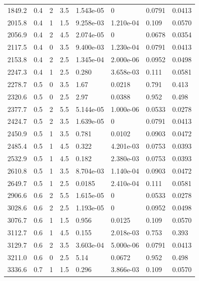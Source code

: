 \documentclass[preview]{standalone}
\begin{document}
{{{\begin{tabular}{L{1.2cm}C{1.2cm} C{0.3cm}C{0.5cm} C{1.4cm}C{1.4cm} C{1.4cm}C{1.4cm}}
  1849.2  &   0.4  & 2     & 3.5 &  1.543e-05  & 0  & 0.0791 &  0.0413   \\ 
  2015.8  &   0.4  & 1     & 1.5 &  9.258e-03  & 1.210e-04  & 0.109 &  0.0570   \\ 
  2056.9  &   0.4  & 2     & 4.5 &  2.074e-05  & 0  & 0.0678 &  0.0354   \\ 
  2117.5  &   0.4  & 0     & 3.5 &  9.400e-03  & 1.230e-04  & 0.0791 &  0.0413   \\ 
  2153.8  &   0.4  & 2     & 2.5 &  1.345e-04  & 2.000e-06  & 0.0952 &  0.0498   \\ 
  2247.3  &   0.4  & 1     & 2.5 &  0.280  & 3.658e-03  & 0.111 &  0.0581   \\ 
  2278.7  &   0.5  & 0     & 3.5 &  1.67  & 0.0218  & 0.791 &  0.413   \\ 
  2320.6  &   0.5  & 0     & 2.5 &  2.97  & 0.0388  & 0.952 &  0.498   \\ 
  2377.7  &   0.5  & 2     & 5.5 &  5.144e-05  & 1.000e-06  & 0.0533 &  0.0278   \\ 
  2424.7  &   0.5  & 2     & 3.5 &  1.639e-05  & 0  & 0.0791 &  0.0413   \\ 
  2450.9  &   0.5  & 1     & 3.5 &  0.781  & 0.0102  & 0.0903 &  0.0472   \\ 
  2485.4  &   0.5  & 1     & 4.5 &  0.322  & 4.201e-03  & 0.0753 &  0.0393   \\ 
  2532.9  &   0.5  & 1     & 4.5 &  0.182  & 2.380e-03  & 0.0753 &  0.0393   \\ 
  2610.8  &   0.5  & 1     & 3.5 &  8.704e-03  & 1.140e-04  & 0.0903 &  0.0472   \\ 
  2649.7  &   0.5  & 1     & 2.5 &  0.0185  & 2.410e-04  & 0.111 &  0.0581   \\ 
  2906.6  &   0.6  & 2     & 5.5 &  1.615e-05  & 0  & 0.0533 &  0.0278   \\ 
  3028.6  &   0.6  & 2     & 2.5 &  1.193e-05  & 0  & 0.0952 &  0.0498   \\ 
  3076.7  &   0.6  & 1     & 1.5 &  0.956  & 0.0125  & 0.109 &  0.0570   \\ 
  3112.7  &   0.6  & 1     & 4.5 &  0.155  & 2.018e-03  & 0.753 &  0.393   \\ 
  3129.7  &   0.6  & 2     & 3.5 &  3.603e-04  & 5.000e-06  & 0.0791 &  0.0413   \\ 
  3211.0  &   0.6  & 0     & 2.5 &  5.14  & 0.0672  & 0.952 &  0.498   \\ 
  3336.6  &   0.7  & 1     & 1.5 &  0.296  & 3.866e-03  & 0.109 &  0.0570   \\ 

\end{tabular}}}}
\end{document}
